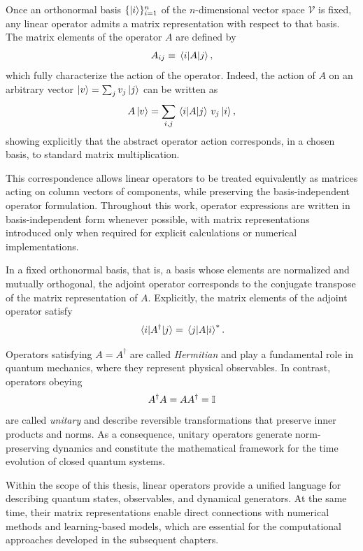 Once an orthonormal basis $\{\ket{i}\}_{i=1}^{n}$ of the $n$-dimensional vector space $\mathcal{V}$ is fixed, any linear operator admits a matrix representation with respect to that basis. The matrix elements of the operator $A$ are defined by
\begin{equation}
    A_{ij} \equiv \mel{i}{A}{j},
\end{equation}
which fully characterize the action of the operator. Indeed, the action of $A$ on an arbitrary vector $\ket{v} = \sum_j v_j \ket{j}$ can be written as
\begin{equation}
    A\ket{v}
    =
    \sum_{i,j} \mel{i}{A}{j} \, v_j \ket{i},
\end{equation}
showing explicitly that the abstract operator action corresponds, in a chosen basis, to standard matrix multiplication.

This correspondence allows linear operators to be treated equivalently as matrices acting on column vectors of components, while preserving the basis-independent operator formulation. Throughout this work, operator expressions are written in basis-independent form whenever possible, with matrix representations introduced only when required for explicit calculations or numerical implementations.

In a fixed orthonormal basis, that is, a basis whose elements are normalized and mutually orthogonal, the adjoint operator corresponds to the conjugate transpose of the matrix representation of $A$. Explicitly, the matrix elements of the adjoint operator satisfy
\begin{equation}
    \mel{i}{A^\dagger}{j} = \mel{j}{A}{i}^\ast.
\end{equation}

Operators satisfying $A = A^\dagger$ are called \emph{Hermitian} and play a fundamental role in quantum mechanics, where they represent physical observables. In contrast, operators obeying
\begin{equation}
    A^\dagger A = A A^\dagger = \mathbb{I}
\end{equation}
are called \emph{unitary} and describe reversible transformations that preserve inner products and norms. As a consequence, unitary operators generate norm-preserving dynamics and constitute the mathematical framework for the time evolution of closed quantum systems.

Within the scope of this thesis, linear operators provide a unified language for describing quantum states, observables, and dynamical generators. At the same time, their matrix representations enable direct connections with numerical methods and learning-based models, which are essential for the computational approaches developed in the subsequent chapters.

